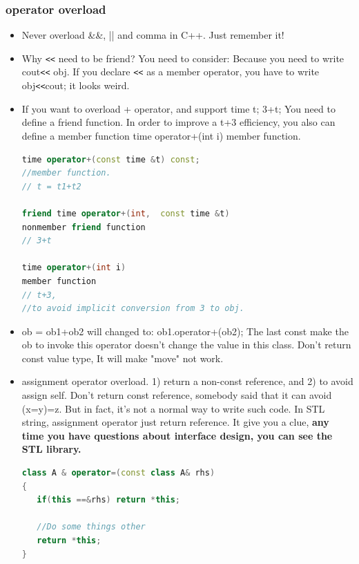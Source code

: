 \documentclass[a4paper,12pt,twoside]{book}
\begin{document}
\subsubsection{operator overload}

\begin{itemize}

\item Never overload \&\&, || and comma in C++.  Just remember it!

\item Why \verb=<<= need to be friend? You need to consider:  Because you need to write cout\verb=<<= obj. If you declare \verb=<<= as a member operator, you have to write obj\verb=<<=cout; it looks weird.

\item If you want to overload + operator, and support time t; 3+t;   You need to define a friend function. In order to improve a t+3 efficiency, you also can define a member function time operator+(int i) member function.
\begin{lstlisting}[frame=single, language=c++]
time operator+(const time &t) const;
//member function.
// t = t1+t2

friend time operator+(int,  const time &t)
nonmember friend function
// 3+t

time operator+(int i)
member function
// t+3,
//to avoid implicit conversion from 3 to obj.
\end{lstlisting}

\item ob = ob1+ob2 will changed to:  ob1.operator+(ob2);  The last const make the ob to invoke this operator doesn't change the value in this class. Don't return const value type, It will make "move" not work.

\item assignment operator overload. 1) return a non-const reference, and 2) to avoid assign self. Don't return const reference, somebody said that it can avoid (x=y)=z. But in fact, it's not a normal way to write such code. In STL string, assignment operator just return reference. It give you a clue, \textbf{any time you have questions about interface design, you can see the STL library.}
\begin{lstlisting}[frame=single, language=c++]
class A & operator=(const class A& rhs)
{
   if(this ==&rhs) return *this;

   //Do some things other
   return *this;
}
\end{lstlisting}

\end{itemize}
\end{document}
